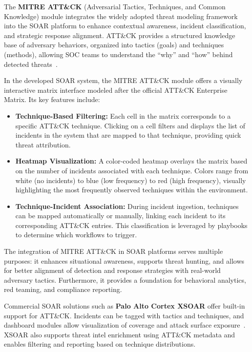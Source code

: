 The \textbf{MITRE ATT\&CK} (Adversarial Tactics, Techniques, and Common Knowledge) module integrates the widely adopted threat modeling framework into the SOAR platform to enhance contextual awareness, incident classification, and strategic response alignment. ATT\&CK provides a structured knowledge base of adversary behaviors, organized into tactics (goals) and techniques (methods), allowing SOC teams to understand the “why” and “how” behind detected threats~\cite{mitre}.

In the developed SOAR system, the MITRE ATT\&CK module offers a visually interactive matrix interface modeled after the official ATT\&CK Enterprise Matrix. Its key features include:

\begin{itemize}
    \item \textbf{Technique-Based Filtering:} Each cell in the matrix corresponds to a specific ATT\&CK technique. Clicking on a cell filters and displays the list of incidents in the system that are mapped to that technique, providing quick threat attribution.
    
    \item \textbf{Heatmap Visualization:} A color-coded heatmap overlays the matrix based on the number of incidents associated with each technique. Colors range from white (no incidents) to blue (low frequency) to red (high frequency), visually highlighting the most frequently observed techniques within the environment.
    
    \item \textbf{Technique-Incident Association:} During incident ingestion, techniques can be mapped automatically or manually, linking each incident to its corresponding ATT\&CK entries. This classification is leveraged by playbooks to determine which workflows to trigger.
\end{itemize}

The integration of MITRE ATT\&CK in SOAR platforms serves multiple purposes: it enhances situational awareness, supports threat hunting, and allows for better alignment of detection and response strategies with real-world adversary tactics. Furthermore, it provides a foundation for behavioral analytics, red teaming, and compliance reporting.

Commercial SOAR solutions such as \textbf{Palo Alto Cortex XSOAR} offer built-in support for ATT\&CK. Incidents can be tagged with tactics and techniques, and dashboard modules allow visualization of coverage and attack surface exposure~\cite{paloalto}. XSOAR also supports threat intel enrichment using ATT\&CK metadata and enables filtering and reporting based on technique distributions.

